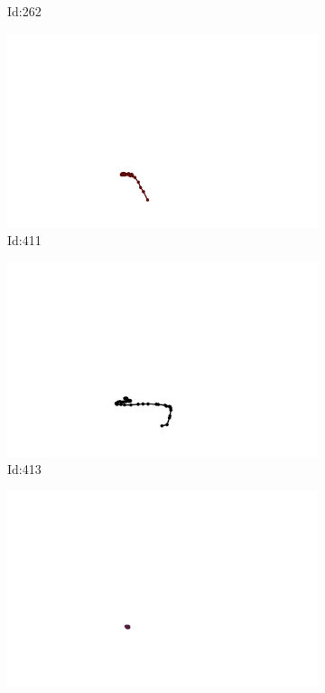 \documentclass[12pt,twoside]{report}
\begin{document}
\begin{figure}
\begin{subfigure}[b]{0.20\textwidth}
\caption{Id:262}
\end{subfigure}
\begin{subfigure}[b]{0.20\textwidth}
\centering
\includegraphics[width=\textwidth]{../../trajectories/411.png}
\caption{Id:411}
\end{subfigure}
\begin{subfigure}[b]{0.20\textwidth}
\centering
\includegraphics[width=\textwidth]{../../trajectories/413.png}
\caption{Id:413}
\end{subfigure}
\begin{subfigure}[b]{0.20\textwidth}
\centering
\includegraphics[width=\textwidth]{../../trajectories/414.png}

\end{subfigure}
\end{figure}
\end{document}
